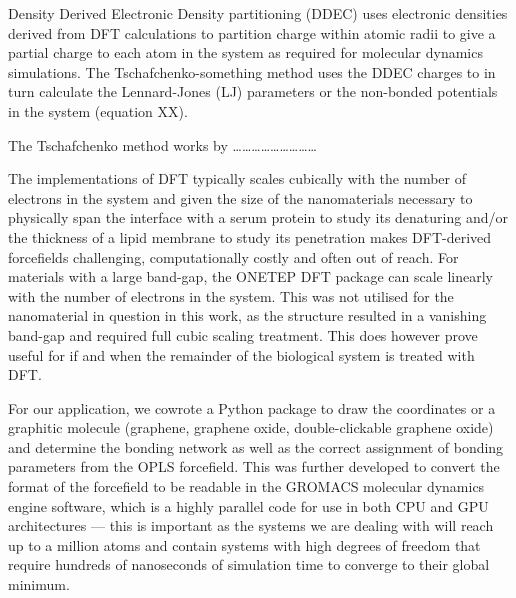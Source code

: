 Density Derived Electronic Density partitioning (DDEC) uses electronic densities derived from DFT calculations to partition charge within atomic radii to give a partial charge to each atom in the system as required for molecular dynamics simulations. The Tschafchenko-something method uses the DDEC charges to in turn calculate the Lennard-Jones (LJ) parameters or the non-bonded potentials in the system (equation XX). 

The Tschafchenko method works by ………………………

The implementations of DFT typically scales cubically with the number of electrons in the system and given the size of the nanomaterials necessary to physically span the interface with a serum protein to study its denaturing and/or the thickness of a lipid membrane to study its penetration makes DFT-derived forcefields challenging, computationally costly and often out of reach. For materials with a large band-gap, the ONETEP DFT package can scale linearly with the number of electrons in the system. This was not utilised for the nanomaterial in question in this work, as the structure resulted in a vanishing band-gap and required full cubic scaling treatment. This does however prove useful for if and when the remainder of the biological system is treated with DFT. 

For our application, we cowrote a Python package to draw the coordinates or a graphitic molecule (graphene, graphene oxide, double-clickable graphene oxide) and determine the bonding network as well as the correct assignment of bonding parameters from the OPLS forcefield. This was further developed to convert the format of the forcefield to be readable in the GROMACS molecular dynamics engine software, which is a highly parallel code for use in both CPU and GPU architectures — this is important as the systems we are dealing with will reach up to a million atoms and contain systems with high degrees of freedom that require hundreds of nanoseconds of simulation time to converge to their global minimum. 

